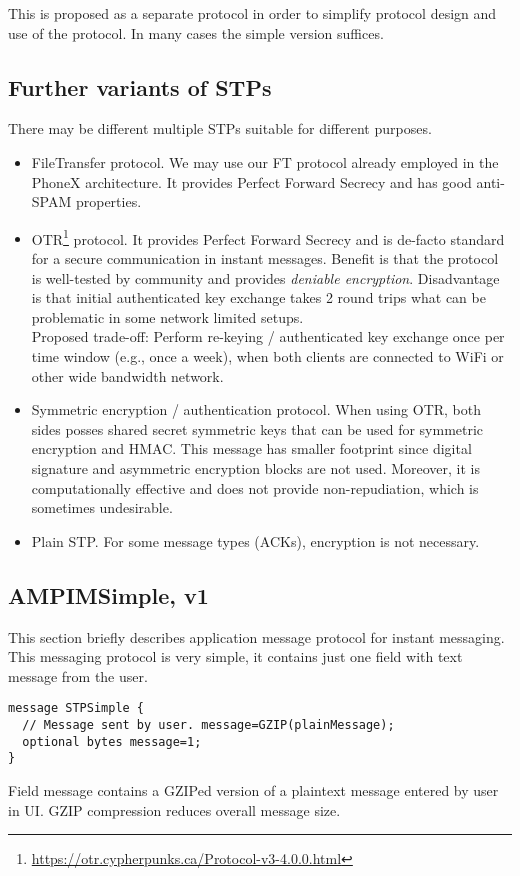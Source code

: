 \documentclass[a4paper,10pt]{article}
\begin{document}
This is proposed as a separate protocol in order to simplify protocol design and use of the protocol.
In many cases the simple version suffices.

\subsection{Further variants of STPs}
There may be different multiple STPs suitable for different purposes.
\begin{itemize}
 \item FileTransfer protocol. We may use our FT protocol already employed in the PhoneX architecture. It provides Perfect Forward Secrecy
 and has good anti-SPAM properties. 
 
 \item OTR\footnote{\url{https://otr.cypherpunks.ca/Protocol-v3-4.0.0.html}} protocol. It provides Perfect Forward Secrecy and is 
 de-facto standard for a secure communication in instant messages. Benefit is that the protocol is well-tested by community
 and provides \emph{deniable encryption}. Disadvantage is that initial authenticated key exchange takes 2 round trips what can be 
 problematic in some network limited setups. \\
 Proposed trade-off: Perform re-keying / authenticated key exchange once per time window (e.g., once a week), when both clients 
 are connected to WiFi or other wide bandwidth network. 
 
 \item Symmetric encryption / authentication protocol. When using OTR, both sides posses shared secret symmetric keys that can be used
 for symmetric encryption and HMAC. This message has smaller footprint since digital signature and asymmetric encryption blocks
 are not used. Moreover, it is computationally effective and does not provide non-repudiation, which is sometimes undesirable.
 
 \item Plain STP. For some message types (ACKs), encryption is not necessary.
\end{itemize}


\subsection{AMPIMSimple, v1}
This section briefly describes application message protocol for instant messaging. This messaging protocol is very simple,
it contains just one field with text message from the user. 

\begin{Verbatim}[frame=single]
message STPSimple {
  // Message sent by user. message=GZIP(plainMessage);
  optional bytes message=1;
}
\end{Verbatim} 

Field message contains a GZIPed version of a plaintext message entered by user in UI. GZIP compression reduces 
overall message size.
\end{document}
